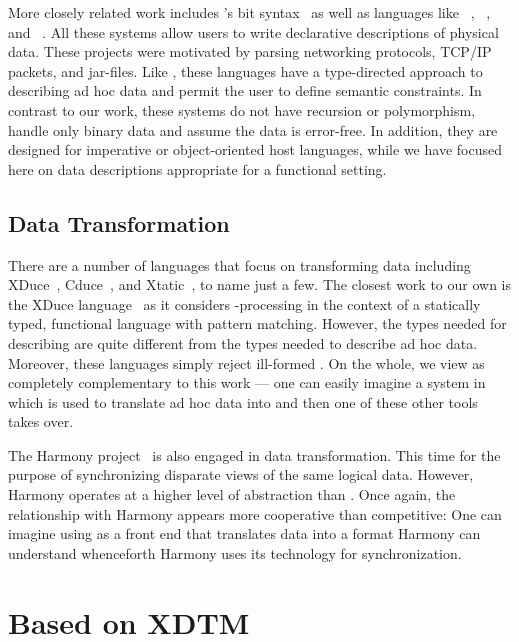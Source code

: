 \documentclass[11pt]{article}
\begin{document}
More closely related work includes \erlang{}'s bit
syntax~\cite{erlang} as well as languages like \packettypes~\cite{sigcomm00},
\datascript~\cite{gpce02}, and \blt~\cite{eger:blt}. 
All these systems allow users to write declarative
descriptions of physical data.  These projects were motivated by
parsing networking protocols, \textsc{TCP/IP} packets, and \java{} 
jar-files.  Like \datatype, these languages have a type-directed
approach to describing ad hoc data and permit the user to define
semantic constraints.  In contrast to our work, these systems 
do not have recursion or polymorphism, handle
only binary data and assume the data is error-free.
In addition, they are designed for imperative or object-oriented host
languages, while we have focused here on data descriptions appropriate for a
functional setting.

\subsection{Data Transformation}
There are a number of languages that focus on transforming \xml{}
data including XDuce~\cite{hosoya+:xduce-journal}, 
Cduce~\cite{benzaken+:cduce}, and 
Xtatic~\cite{gapeyev+:XtaticRuntime}, to name just a few.
The closest work to our own is the XDuce
language~\cite{hosoya+:xduce-journal} as it considers
\xml-processing in the context of a
statically typed, functional language with pattern matching. 
However, the types needed for describing \xml{} are quite different
from the types needed to describe ad hoc data.  Moreover,
these languages simply reject ill-formed \xml.  On the whole,
we view \datatype{} as completely complementary to this work ---
one can easily imagine a system in which \datatype{} is used to translate
ad hoc data into \xml{} and then one of these other tools takes over.
 
The Harmony project~\cite{foster+:lenses} is also engaged in 
data transformation.  This time for the purpose of synchronizing
disparate views of the same logical data. 
However, Harmony operates at a higher 
level of abstraction than \datatype.  Once again, the relationship 
with Harmony appears more cooperative than competitive:  One can 
imagine using \datatype{} as a front end that translates data into 
a format Harmony can understand whenceforth Harmony uses
its technology for synchronization.  

\section{Based on XDTM}
\end{document}
